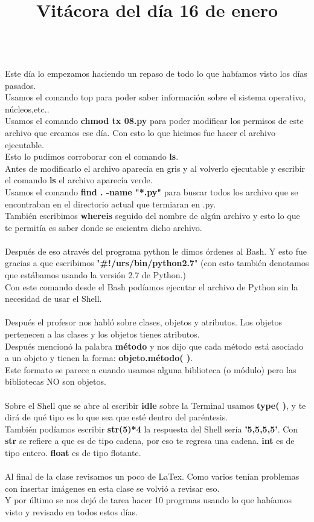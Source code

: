 \documentclass{article}
\begin{document}
	\title{\huge\textbf{Vitácora del día 16 de enero\\}} \\
	Este día lo empezamos haciendo un repaso de todo lo que habíamos visto los días pasados. \\
	Usamos el comando top para poder saber información sobre el sistema operativo, núcleos,etc..\\
	Usamos el comando \textbf{chmod tx 08.py} para poder modificar los permisos de este archivo que creamos ese día. Con esto lo que hicimos fue hacer el archivo ejecutable. \\
	Esto lo pudimos corroborar con el comando \textbf{ls}. \\
	Antes de modificarlo el archivo aparecía en gris y al volverlo ejecutable y escribir el comando \textbf{ls} el archivo aparecía verde. \\
	Usamos el comando \textbf{find . -name "*.py"} para buscar todos los archivo que se encontraban en el directorio actual que termiaran en .py.\\ 
	También escribimos \textbf{whereis } seguido del nombre de algún archivo y esto lo que te permitía es saber donde se escientra dicho archivo.\\ \\
	Después de eso através del programa python le dimos órdenes al Bash. Y esto fue gracias a que escribimos "\textbf{\#!/urs/bin/python2.7}" (con esto también denotamos que estábamos usando la versión 2.7 de Python.) \\
	Con este comando desde el Bash podíamos ejecutar el archivo de Python sin la necesidad de usar el Shell.\\ \\ 
	Después el profesor nos habló sobre clases, objetos y atributos. Los objetos pertenecen a las clases y los objetos tienes atributos.\\
	Después mencionó la palabra \textbf{método} y nos dijo que cada método está asociado a un objeto y tienen la forma: \textbf{objeto.método( )}. \\
	Este formato se parece a cuando usamos alguna biblioteca (o módulo) pero las bibliotecas NO son objetos.\\ \\
	Sobre el Shell que se abre al escribir \textbf{idle} sobre la Terminal usamos \textbf{type( )}, y te dirá de qué tipo es lo que sea que esté dentro del paréntesis. \\
	También podíamos escribir \textbf{str(5)*4} la respuesta del Shell sería \textbf{'5,5,5,5'}. Con \textbf{str} se refiere a que es de tipo cadena, por eso te regresa una cadena. \textbf{int} es de tipo entero. \textbf{float} es de tipo flotante.\\ \\ 
	Al final de la clase revisamos un poco de LaTex. Como varios tenían problemas con insertar imágenes en esta clase se volvió a revisar eso. \\
	Y por último se nos dejó de tarea hacer 10 progrmas usando lo que habíamos visto y revisado en todos estos días.
	
\end{document}
